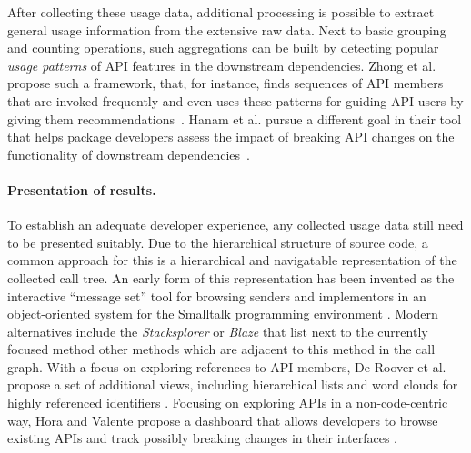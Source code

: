 \documentclass[a4paper,twoside]{article}
\begin{document}
After collecting these usage data, additional processing is possible to extract general usage information from the extensive raw data.
Next to basic grouping and counting operations, such aggregations can be built by detecting popular \emph{usage patterns} of API features in the downstream dependencies.
Zhong et al. propose such a framework, that, for instance, finds sequences of API members that are invoked frequently and even uses these patterns for guiding API users by giving them recommendations~\cite{zhong2009mapo}.
Hanam et al. pursue a different goal in their tool that helps package developers assess the impact of breaking API changes on the functionality of downstream dependencies~\cite{hanam2019aiding}.

\paragraph{Presentation of results.}
\label{sec:related_work/presentation}

To establish an adequate developer experience, any collected usage data still need to be presented suitably.
Due to the hierarchical structure of source code, a common approach for this is a hierarchical and navigatable representation of the collected call tree.
An early form of this representation has been invented as the interactive \enquote{message set} tool for browsing senders and implementors in an object-oriented system for the Smalltalk programming environment \cite{goldberg1984smalltalk}.
Modern alternatives include the \emph{Stacksplorer} \cite{karrer2011stacksplorer} or \emph{Blaze} \cite{kramer2012blaze} that list next to the currently focused method other methods which are adjacent to this method in the call graph.
With a focus on exploring references to API members, De Roover et al. propose a set of additional views, including hierarchical lists and word clouds for highly referenced identifiers \cite{de2013multi}.
Focusing on exploring APIs in a non-code-centric way, Hora and Valente propose a dashboard that allows developers to browse existing APIs and track possibly breaking changes in their interfaces \cite{hora2015apiwave}.
\end{document}
